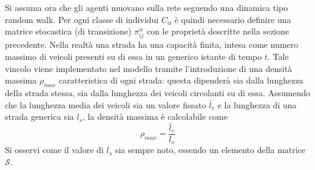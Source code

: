 \documentclass[../main.tex]{subfiles}
\begin{document}
Si assuma ora che gli agenti muovano sulla rete seguendo una dinamica tipo random walk.
Per ogni classe di individui $C_{\alpha}$ \`e quindi necessario definire una matrice stocastica (di transizione) $\pi_{ij}^{\alpha}$ con le propriet\`a descritte nella sezione precedente.
Nella realt\`a una strada ha una capacit\`a finita, intesa come numero massimo di veicoli presenti su di essa in un generico istante di tempo $t$.
Tale vincolo viene implementato nel modello tramite l'introduzione di una densit\`a massima $\rho_{max}$ caratteristica di ogni strada: questa dipender\`a sia dalla lunghezza della strada stessa, sia dalla lunghezza dei veicoli circolanti su di essa.
Assumendo che la lunghezza media dei veicoli sia un valore fissato $\bar{l}_v$ e la lunghezza di una strada generica sia $l_s$, la densit\`a massima \`e calcolabile come
\begin{equation}
    \rho_{max}=\frac{\bar{l}_v}{l_s}
    \label{eq:density}
\end{equation}
Si osservi come il valore di $l_s$ sia sempre noto, essendo un elemento della matrice $\mathcal{S}$.
\end{document}
